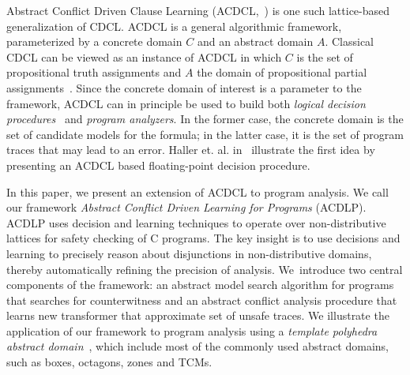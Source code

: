 Abstract Conflict Driven Clause Learning (ACDCL,~\cite{dhk2013-popl}) is one 
such lattice-based generalization of CDCL.  ACDCL is a general algorithmic 
framework, parameterized by a concrete domain $C$  and an abstract domain
$A$. Classical CDCL can be viewed as an instance of ACDCL 
in which $C$ is the set of propositional truth assignments and $A$ the 
domain of propositional partial assignments~\cite{leo-thesis}.  Since 
the concrete domain of interest is a parameter to the framework, 
ACDCL can in principle be used to build both 
\emph{logical decision procedures}~\cite{DBLP:journals/fmsd/BrainDGHK14} 
and \emph{program analyzers}.  In the former case, the concrete domain is the 
set of candidate models for the formula; in the latter case, it is the 
set of program traces that may lead to an error.  Haller et. al. 
in~\cite{DBLP:journals/fmsd/BrainDGHK14} illustrate the 
first idea by presenting an ACDCL based floating-point decision procedure.  
%


In this paper, we present an extension of ACDCL to program analysis.
We call our framework \emph{Abstract Conflict Driven Learning for Programs}
(ACDLP).   ACDLP uses decision and learning techniques to operate over
non-distributive lattices for safety checking of C programs.  The key insight
is to use decisions and learning to precisely reason about disjunctions in
non-distributive domains, thereby automatically refining the precision of
analysis.  We~introduce two central components of the framework: an abstract
model search algorithm for programs that searches for counterwitness and an 
abstract conflict analysis procedure that learns new transformer that
approximate set of unsafe traces.  
We illustrate the application of our framework to program analysis 
using a \textit{template polyhedra abstract domain}~\cite{tacas08}, which 
include most of the commonly used abstract domains, such as boxes, 
octagons, zones and TCMs.  

